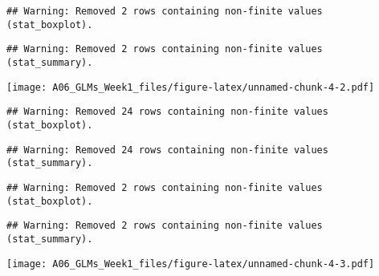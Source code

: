 \documentclass[]{article}
\newenvironment{Shaded}{\begin{snugshade}}{\end{snugshade}}
\newcommand{\CommentTok}[1]{\textcolor[rgb]{0.56,0.35,0.01}{\textit{#1}}}
\newcommand{\DataTypeTok}[1]{\textcolor[rgb]{0.13,0.29,0.53}{#1}}
\newcommand{\DecValTok}[1]{\textcolor[rgb]{0.00,0.00,0.81}{#1}}
\newcommand{\KeywordTok}[1]{\textcolor[rgb]{0.13,0.29,0.53}{\textbf{#1}}}
\newcommand{\NormalTok}[1]{#1}
\newcommand{\OperatorTok}[1]{\textcolor[rgb]{0.81,0.36,0.00}{\textbf{#1}}}
\newcommand{\StringTok}[1]{\textcolor[rgb]{0.31,0.60,0.02}{#1}}
\begin{document}
\begin{verbatim}
## Warning: Removed 2 rows containing non-finite values (stat_boxplot).
\end{verbatim}

\begin{verbatim}
## Warning: Removed 2 rows containing non-finite values (stat_summary).
\end{verbatim}

\texttt{[image: A06\_GLMs\_Week1\_files/figure-latex/unnamed-chunk-4-2.pdf]}

\begin{Shaded}
\end{Shaded}

\begin{verbatim}
## Warning: Removed 24 rows containing non-finite values (stat_boxplot).
\end{verbatim}

\begin{verbatim}
## Warning: Removed 24 rows containing non-finite values (stat_summary).
\end{verbatim}

\begin{verbatim}
## Warning: Removed 2 rows containing non-finite values (stat_boxplot).
\end{verbatim}

\begin{verbatim}
## Warning: Removed 2 rows containing non-finite values (stat_summary).
\end{verbatim}

\texttt{[image: A06\_GLMs\_Week1\_files/figure-latex/unnamed-chunk-4-3.pdf]}
\end{document}
